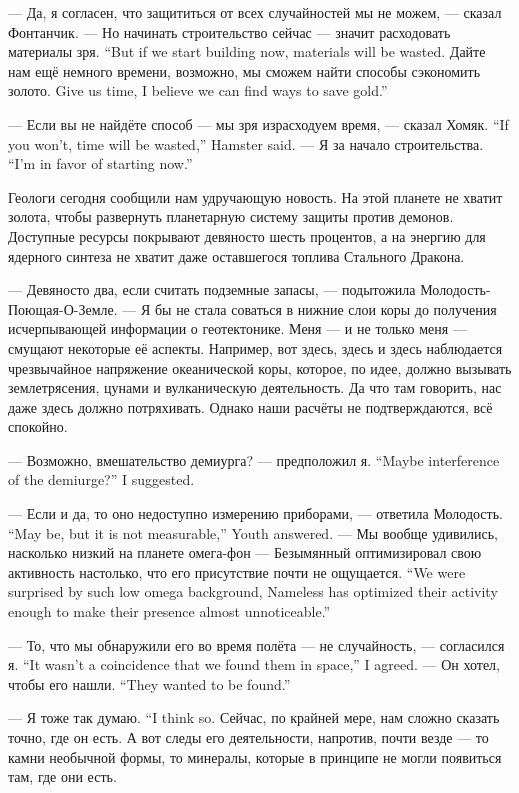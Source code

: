 --- Да, я согласен, что защититься от всех случайностей мы не можем, --- сказал Фонтанчик.
{--- Но начинать строительство сейчас --- значит расходовать материалы зря.}
{``But if we start building now, materials will be wasted.}
{Дайте нам ещё немного времени, возможно, мы сможем найти способы сэкономить золото.}
{Give us time, I believe we can find ways to save gold.''}

{--- Если вы не найдёте способ --- мы зря израсходуем время, --- сказал Хомяк.}
{``If you won't, time will be wasted,'' Hamster said.}
{--- Я за начало строительства.}
{``I'm in favor of starting now.''}

Геологи сегодня сообщили нам удручающую новость.
На этой планете не хватит золота, чтобы развернуть планетарную систему защиты против демонов.
Доступные ресурсы покрывают девяносто шесть процентов, а на энергию для ядерного синтеза не хватит даже оставшегося топлива Стального Дракона.

--- Девяносто два, если считать подземные запасы, --- подытожила Молодость-Поющая-О-Земле.
--- Я бы не стала соваться в нижние слои коры до получения исчерпывающей информации о геотектонике.
Меня --- и не только меня --- смущают некоторые её аспекты.
Например, вот здесь, здесь и здесь наблюдается чрезвычайное напряжение океанической коры, которое, по идее, должно вызывать землетрясения, цунами и вулканическую деятельность.
Да что там говорить, нас даже здесь должно потряхивать.
Однако наши расчёты не подтверждаются, всё спокойно.

{--- Возможно, вмешательство демиурга? --- предположил я.}
{``Maybe interference of the demiurge?'' I suggested.}

{--- Если и да, то оно недоступно измерению приборами, --- ответила Молодость.}
{``May be, but it is not measurable,'' Youth answered.}
{--- Мы вообще удивились, насколько низкий на планете омега-фон --- Безымянный оптимизировал свою активность настолько, что его присутствие почти не ощущается.}
{``We were surprised by such low omega background, Nameless has optimized their activity enough to make their presence almost unnoticeable.''}

{--- То, что мы обнаружили его во время полёта --- не случайность, --- согласился я.}
{``It wasn't a coincidence that we found them in space,'' I agreed.}
{--- Он хотел, чтобы его нашли.}
{``They wanted to be found.''}

{--- Я тоже так думаю.}
{``I think so.}
Сейчас, по крайней мере, нам сложно сказать точно, где он есть.
А вот следы его деятельности, напротив, почти везде --- то камни необычной формы, то минералы, которые в принципе не могли появиться там, где они есть.


